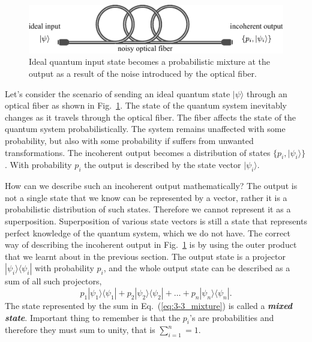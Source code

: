 \begin{figure}[t]
    \centering
    \includegraphics[width=\textwidth]{lesson3/3-3_noisy_communication.pdf}
    \caption[Noisy quantum communication]{Ideal quantum input state becomes a probabilistic mixture at the output as a result of the noise introduced by the optical fiber.}
    \label{fig:3-3_noisy_communication}
\end{figure}

Let's consider the scenario of sending an ideal quantum state $|\psi\rangle$ through an optical fiber as shown in Fig.~\ref{fig:3-3_noisy_communication}.
The state of the quantum system inevitably changes as it travels through the optical fiber.
The fiber affects the state of the quantum system probabilistically.
The system remains unaffected with some probability, but also with some probability if suffers from unwanted transformations.
The incoherent output becomes a distribution of states $\{p_i, |\psi_i\rangle\}$.
With probability $p_i$ the output is described by the state vector $|\psi_i\rangle$.

How can we describe such an incoherent output mathematically?
The output is not a single state that we know can be represented by a vector, rather it is a probabilistic distribution of such states.
Therefore we cannot represent it as a superposition.
Superposition of various state vectors is still a state that represents perfect knowledge of the quantum system, which we do not have.
The correct way of describing the incoherent output in Fig.~\ref{fig:3-3_noisy_communication} is by using the outer product that we learnt about in the previous section.
The output state is a projector $|\psi_i\rangle\langle\psi_i|$ with probability $p_i$, and the whole output state can be described as a sum of all such projectors,
\begin{equation}
    p_1 |\psi_1\rangle\langle\psi_1| + p_2 |\psi_2\rangle\langle\psi_2| + \ldots + p_n |\psi_n\rangle\langle\psi_n|.
    \label{eq:3-3_mixture}
\end{equation}
The state represented by the sum in Eq.~(\ref{eq:3-3_mixture}) is called a \textit{\textbf{mixed state}}.
Important thing to remember is that the $p_i$'s are probabilities and therefore they must sum to unity, that is $\sum_{i=1}^n=1$.

